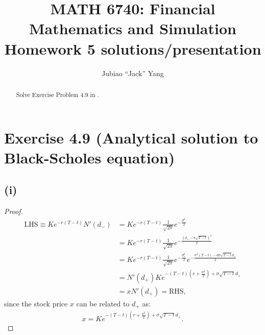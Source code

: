 \documentclass[final,3p,authoryear]{elsarticle}
\begin{document}
\begin{frontmatter}

\title{MATH 6740: Financial Mathematics and Simulation\\
	Homework 5 solutions/presentation}

\author[rvt]{Jubiao ``Jack'' Yang}

\address[rvt]{Rensselaer Polytechnic Institute, Troy, NY 12180}

\begin{abstract}
	Solve Exercise Problem 4.9 in \cite[Chapter 4]{shreve2004stochastic}.
\end{abstract}


\end{frontmatter}


\section{Exercise 4.9 (Analytical solution to Black-Scholes equation)}
	\subsection{(i)}
		\begin{proof}
			\begin{align}
				\text{LHS}\equiv K e^{-r\left(T-t\right)} N'(d_-) &= K e^{-r\left(T-t\right)} \frac{1}{\sqrt{2\pi}} e^{-\frac{d_-^2}{2}}
				\nonumber\\
				&= K e^{-r\left(T-t\right)} \frac{1}{\sqrt{2\pi}} e^{-\frac{\left(d_+ - \sigma \sqrt{T-t}\right)^2}{2}}
				\nonumber\\
				&= K e^{-r\left(T-t\right)} \frac{1}{\sqrt{2\pi}} e^{-\frac{d_+^2}{2}} e^{-\frac{\sigma^2\left(T-t\right)-d\sigma \sqrt{T-t} d_+}{2}}
				\nonumber\\
				&= N'(d_+) K e^{-\left(T-t\right)\left(r+\frac{\sigma^2}{2}\right)+\sigma\sqrt{T-t}d_+}
				\nonumber\\
				&= x N'(d_+) = \text{RHS}
				,
			\end{align}
			since the stock price $x$ can be related to $d_+$ as:
			\begin{eqnarray}
				x=K e^{-\left(T-t\right)\left(r+\frac{\sigma^2}{2}\right)+\sigma\sqrt{T-t}d_+}
				.
			\end{eqnarray}
		\end{proof}
	
\end{document}
